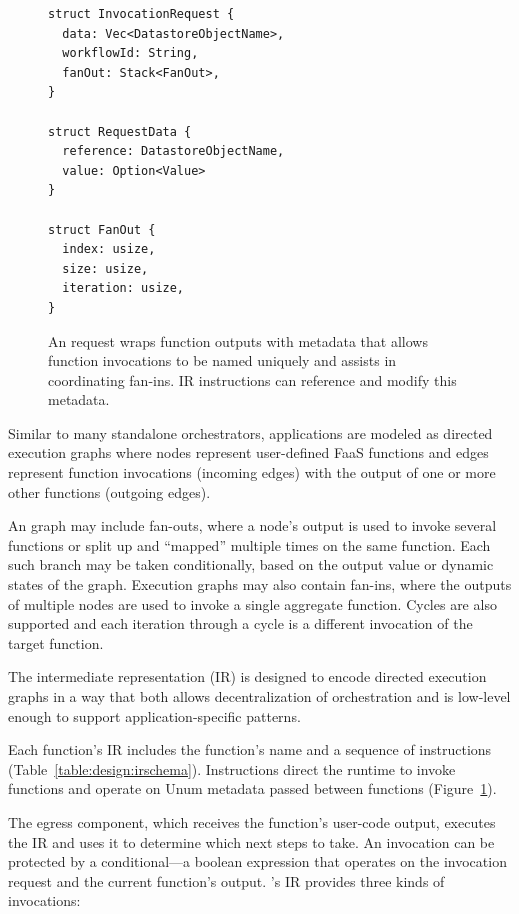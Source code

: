 \begin{figure}[t]
    \centering
    \begin{verbatim}
struct InvocationRequest {
  data: Vec<DatastoreObjectName>,
  workflowId: String,
  fanOut: Stack<FanOut>,
}

struct RequestData {
  reference: DatastoreObjectName,
  value: Option<Value>
}

struct FanOut {
  index: usize,
  size: usize,
  iteration: usize,
}
    \end{verbatim}
    \caption{An \name{} request wraps function outputs with metadata that
allows function invocations to be named uniquely and assists in coordinating
fan-ins. \name{} IR instructions can reference and modify this metadata.}
    \label{fig:design:unum-request}
\end{figure}

Similar to many standalone orchestrators, \name{} applications are modeled as
directed execution graphs where nodes represent user-defined FaaS functions
and edges represent function invocations (incoming edges) with the output of
one or more other functions (outgoing edges).

An \name{} graph may include fan-outs, where a node's output is used to invoke
several functions or split up and ``mapped'' multiple times on the same
function. Each such branch may be taken conditionally, based on the output
value or dynamic states of the graph. Execution graphs may also contain
fan-ins, where the outputs of multiple nodes are used to invoke a single
aggregate function. Cycles are also supported and each iteration through a
cycle is a different invocation of the target function.

The \name{} intermediate representation (IR) is designed to encode directed
execution graphs in a way that both allows decentralization of orchestration
and is low-level enough to support application-specific patterns.

Each function's IR includes the function's name and a sequence of instructions
(Table~\ref{table:design:irschema}). Instructions direct the runtime to invoke
functions and operate on Unum metadata passed between functions
(Figure~\ref{fig:design:unum-request}).

The egress component, which receives the function's user-code output, executes
the IR and uses it to determine which next steps to take. An invocation can be
protected by a conditional---a boolean expression that operates on the
invocation request and the current function's output. \name{}'s IR provides
three kinds of invocations:

